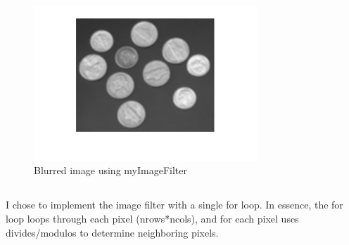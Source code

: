\documentclass[12pt]{article}
\begin{document}
\subsection{}
\begin{figure}[H] \centering \includegraphics[page=1,width=0.75\textwidth]{imagefilter_blur}
\caption{Blurred image using myImageFilter}    \end{figure}   


\newpage
\subsection{}
I chose to implement the image filter with a single for loop. In essence, the for loop loops through each pixel (nrows*ncols), and for each pixel uses divides/modulos to determine neighboring pixels.

\newpage
\end{document}
